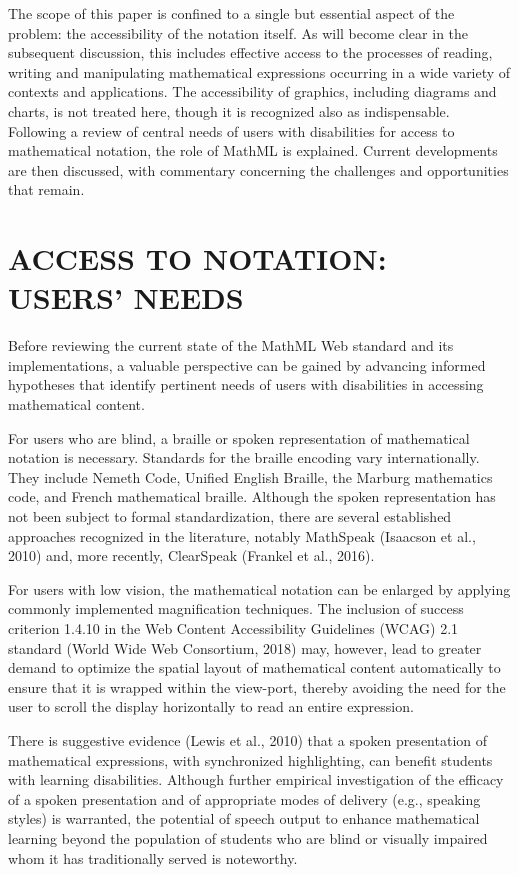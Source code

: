 \documentclass[11.5pt]{sig-alternate} %
\begin{document}
\begin{large}
The scope of this paper is confined to a single but essential aspect of the problem: the accessibility of the notation itself. As will become clear in the subsequent discussion, this includes effective access to the processes of reading, writing and manipulating mathematical expressions occurring in a wide variety of contexts and applications. The accessibility of graphics, including diagrams and charts, is not treated here, though it is recognized also as indispensable. Following a review of central needs of users with disabilities for access to mathematical notation, the role of MathML is explained. Current developments are then discussed, with commentary concerning the challenges and opportunities that remain.

\section*{ACCESS TO NOTATION: USERS’ NEEDS}

Before reviewing the current state of the MathML Web standard and its implementations, a valuable perspective can be gained by advancing informed hypotheses that identify pertinent needs of users with disabilities in accessing mathematical content.

For users who are blind, a braille or spoken representation of mathematical notation is necessary. Standards for the braille encoding vary internationally. They include Nemeth Code, Unified English Braille, the Marburg mathematics code, and French mathematical braille. Although the spoken representation has not been subject to formal standardization, there are several established approaches recognized in the literature, notably MathSpeak (Isaacson et al., 2010) and, more recently, ClearSpeak (Frankel et al., 2016).

For users with low vision, the mathematical notation can be enlarged by applying commonly implemented magnification techniques. The inclusion of success criterion 1.4.10 in the Web Content Accessibility Guidelines (WCAG) 2.1 standard (World Wide Web Consortium, 2018) may, however, lead to greater demand to optimize the spatial layout of mathematical content automatically to ensure that it is wrapped within the view-port, thereby avoiding the need for the user to scroll the display horizontally to read an entire expression.

There is suggestive evidence (Lewis et al., 2010) that a spoken presentation of mathematical expressions, with synchronized highlighting, can benefit students with learning disabilities. Although further empirical investigation of the efficacy of a spoken presentation and of appropriate modes of delivery (e.g., speaking styles) is warranted, the potential of speech output to enhance mathematical learning beyond the population of students who are blind or visually impaired whom it has traditionally served is noteworthy.


\end{large}
\end{document}
